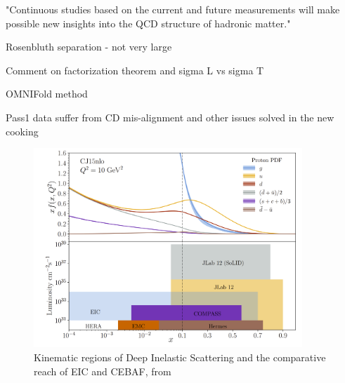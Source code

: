  "Continuous
studies based on the current and future measurements will make possible new insights
into the QCD structure of hadronic matter."

Rosenbluth separation - not very large


Comment on factorization theorem and sigma L vs sigma T

OMNIFold method

Pass1 data suffer from CD mis-alignment and other issues solved in the new cooking



\begin{figure}
    \centering
    \includegraphics[width=0.9\textwidth]{Chapters/Ch5-Further/X_conclusion/pics/future.png}
    \caption[Kinematic Overlap of Future Experiments]{Kinematic regions of Deep Inelastic Scattering and the comparative reach of EIC and CEBAF, from \parencite{Arrington2022PhysicsOpportunities} }
    \label{fig:physics_future_ranges}
\end{figure}
